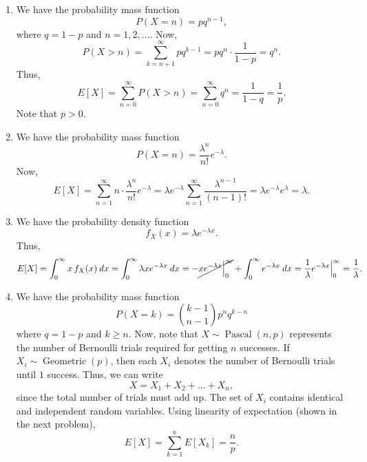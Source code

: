 \documentclass[10pt]{article}
\newcounter{prob}
\newcommand\op[1]{\operatorname{#1}}
\newcommand\E[1]{E[#1]}
\begin{document}
        \begin{enumerate}
            \item We have the probability mass function \[
                P(X = n) = pq^{n - 1},
            \] where $q = 1 - p$ and $n = 1, 2, \dots$. Now, \[
                P(X > n) = \sum_{k = n + 1}^\infty pq^{k - 1} = pq^n \cdot
                \frac{1}{1 - p} = q^n.
            \] Thus, 
            \[
                \E{X} = \sum_{n = 0}^\infty P(X > n)
                = \sum_{n = 0}^\infty q^n = \frac{1}{1 - q} = \frac{1}{p}.
            \] Note that $p > 0$. 

            \item We have the probability mass function \[
                P(X = n) = \frac{\lambda^n}{n!}e^{-\lambda}.
            \] Now, \[
                \E{X} = \sum_{n = 1}^\infty n\cdot \frac{\lambda^n}{n!}e^{-\lambda}
                = \lambda e^{-\lambda}\sum_{n = 1}^\infty 
                    \frac{\lambda^{n - 1}}{(n - 1)!}
                = \lambda e^{-\lambda}e^{\lambda} = \lambda.
            \] 

            \item We have the probability density function \[
                f_X(x) = \lambda e^{-\lambda x}.
            \] Thus, \[
                \E{X} = \int_0^\infty x\,f_X(x)\:dx =
                \int_{0}^\infty \lambda xe^{-\lambda x}\:dx =
                -\cancel{xe^{-\lambda x}\Big|_0^\infty}
                + \int_0^\infty e^{-\lambda x}\:dx =
                \frac{1}{\lambda}e^{-\lambda x}\Big|_0^\infty = \frac{1}{\lambda}.
            \] 

            \item We have the probability mass function \[
                P(X = k) = \binom{k - 1}{n - 1}p^n q^{k - n}
            \] where $q = 1- p$ and $k \geq n$. Now, note that $X \sim
            \op{Pascal}(n, p)$ represents the number of Bernoulli trials required
            for getting $n$ successes. If $X_i \sim \op{Geometric}(p)$, then each
            $X_i$ denotes the number of Bernoulli trials until $1$ success. Thus, we
            can write \[
                X = X_1 + X_2 + \dots + X_n,
            \] since the total number of trials must add up. The set of $X_i$
            contains identical and independent random variables. Using linearity of
            expectation (shown in the next problem), \[
                \E{X} = \sum_{k = 1}^n \E{X_k} = \frac{n}{p}.
            \] 
        \end{enumerate}
\end{document}
